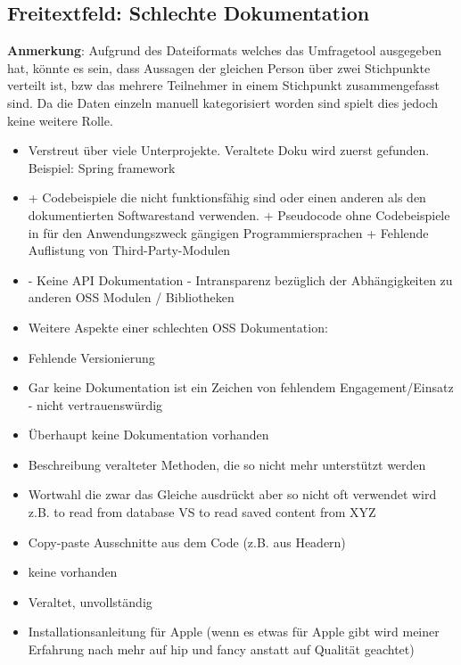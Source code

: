 \subsection{Freitextfeld: Schlechte Dokumentation}

\textbf{Anmerkung}: Aufgrund des Dateiformats welches das Umfragetool ausgegeben hat, könnte es sein, dass Aussagen
der gleichen Person über zwei Stichpunkte verteilt ist, bzw das mehrere Teilnehmer in einem Stichpunkt zusammengefasst sind.
Da die Daten einzeln manuell kategorisiert worden sind spielt dies jedoch keine weitere Rolle.

\begin{multicols}{2}
    \begin{itemize}
        \item Verstreut über viele Unterprojekte.
              Veraltete Doku wird zuerst gefunden.
              Beispiel: Spring framework
        \item + Codebeispiele die nicht funktionsfähig sind oder einen anderen als den dokumentierten Softwarestand verwenden.
              + Pseudocode ohne Codebeispiele in für den Anwendungszweck gängigen Programmiersprachen
              + Fehlende Auflistung von Third-Party-Modulen
        \item - Keine API Dokumentation
              - Intransparenz bezüglich der Abhängigkeiten zu anderen OSS Modulen / Bibliotheken
        \item Weitere Aspekte einer schlechten OSS Dokumentation:
        \item Fehlende Versionierung
        \item Gar keine Dokumentation ist ein Zeichen von fehlendem Engagement/Einsatz - nicht vertrauenswürdig
        \item Überhaupt keine Dokumentation vorhanden
        \item Beschreibung veralteter Methoden, die so nicht mehr unterstützt werden
        \item Wortwahl die zwar das Gleiche ausdrückt aber so nicht oft verwendet wird z.B. to read from database VS to read saved content from XYZ
        \item Copy-paste Ausschnitte aus dem Code (z.B. aus Headern)
        \item keine vorhanden
        \item Veraltet, unvollständig
        \item Installationsanleitung für Apple (wenn es etwas für Apple gibt wird meiner Erfahrung nach mehr auf hip und fancy anstatt auf Qualität geachtet)

\end{itemize}
\end{multicols}
